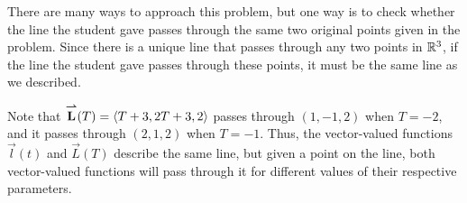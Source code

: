 \documentclass[noauthor, handout]{ximera}
\begin{document}
\begin{problem}
\begin{freeResponse}
There are many ways to approach this problem, but one way is to check whether the line the student gave passes through the same two original points given in the problem.  Since there is a unique line that passes through any two points in $\mathbb R^3$, if the line the student gave passes through these points, it must be the same line as we described.

Note that ${\overset{\boldsymbol{\rightharpoonup}}{\mathbf{L}}}(T) = \left\langle T+3,2T+3,2\right\rangle$ passes through $(1,-1,2)$ when $T= -2$, and it passes through $(2,1,2)$ when $T=-1$.  Thus, the vector-valued functions $\vec{l}(t)$ and $\vec{L}(T)$ describe the same line, but given a point on the line, both vector-valued functions will pass through it for different values of their respective parameters.  

\end{freeResponse}
\end{problem}

\end{document}
